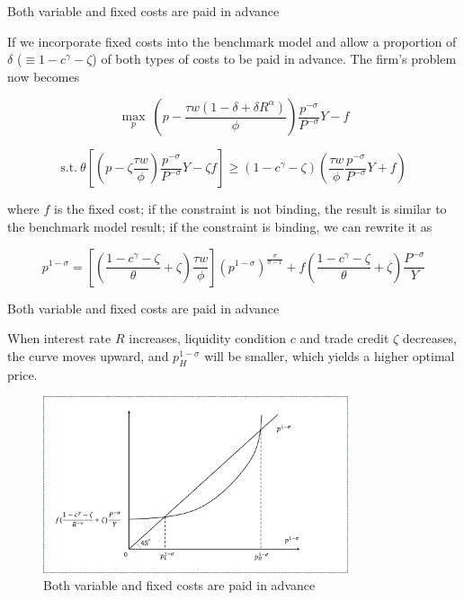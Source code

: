 \documentclass[10pt]{beamer}
\begin{document}
\begin{frame}{Both variable and fixed costs are paid in advance}

If we incorporate fixed costs into the benchmark model and allow a proportion of $\delta$ ($\equiv 1-c^{\gamma}-\zeta$) of both types of costs to be paid in advance. The firm's problem now becomes

$$
\max_{p} \ (p- \frac{\tau w(1-\delta+\delta R^\alpha)}{\phi}) \frac{p^{-\sigma}}{P^{-\sigma}} Y-f
$$

$$
\text{s.t.} \ \theta [(p -\zeta \frac{\tau w}{\phi}) \frac{p^{-\sigma}}{P^{-\sigma}} Y -\zeta f ]\geq(1-c^\gamma-\zeta) (\frac{\tau w}{\phi} \frac{p^{-\sigma}}{P^{-\sigma}} Y+f)
$$

where $f$ is the fixed cost; if the constraint is not binding, the result is similar to the benchmark model result; if the constraint is binding, we can rewrite it as 

\begin{equation}\label{eq:constraint_fixedcost}
p^{1-\sigma}=[(\frac{1-c^{\gamma}-\zeta}{\theta}+\zeta)\frac{\tau w}{\phi}] (p^{1-\sigma})^{\frac{\sigma}{\sigma-1}}+f(\frac{1-c^{\gamma}-\zeta}{\theta}+\zeta)\frac{P^{-\sigma}}{Y}
\end{equation}

\end{frame}


\begin{frame}{Both variable and fixed costs are paid in advance}

When interest rate $R$ increases, liquidity condition $c$ and trade credit $\zeta$ decreases, the curve moves upward, and $p_H^{1-\sigma}$ will be smaller, which yields a higher optimal price.

\begin{figure}[H]
     \centering
         \includegraphics[width=0.8\textwidth]{latex/drafts/pic/fixed_cost.png}
         \caption{\small Both variable and fixed costs are paid in advance}
         \label{fig: fixed_cost}
\end{figure}

\end{frame}
\end{document}
